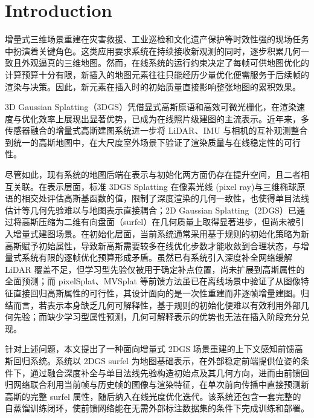 
\section{Introduction}

增量式三维场景重建在灾害救援、工业巡检和文化遗产保护等时效性强的现场任务中扮演着关键角色。这类应用要求系统在持续接收新观测的同时，逐步积累几何一致且外观逼真的三维地图。然而，在线系统的运行约束决定了每帧可供地图优化的计算预算十分有限，新插入的地图元素往往只能经历少量优化便需服务于后续帧的渲染与决策。因此，新元素在插入时的初始质量直接影响整张地图的累积效果。

3D Gaussian Splatting（3DGS）凭借显式高斯原语和高效可微光栅化，在渲染速度与优化效率上展现出显著优势，已成为在线照片级建图的主流表示。近年来，多传感器融合的增量式高斯建图系统进一步将 LiDAR、IMU 与相机的互补观测整合到统一的高斯地图中，在大尺度室外场景下验证了渲染质量与在线稳定性的可行性。

尽管如此，现有系统的地图后端在表示与初始化两方面仍存在提升空间，且二者相互关联。在表示层面，标准 3DGS Splatting 在​​像素光线 (pixel ray)​​ 与三维椭球原语的相交处评估高斯基函数的值，限制了深度渲染的几何一致性，也使得单目法线估计等几何先验难以与地图表示直接耦合；2D Gaussian Splatting（2DGS）已通过将高斯压缩为二维有向盘面（surfel）在几何质量上取得显著进步，但尚未被引入增量式建图场景。在初始化层面，当前系统通常采用基于规则的初始化策略为新高斯赋予初始属性，导致新高斯需要较多在线优化步数才能收敛到合理状态，与增量式系统有限的逐帧优化预算形成矛盾。虽然已有系统引入深度补全网络缓解 LiDAR 覆盖不足，但学习型先验仅被用于确定补点位置，尚未扩展到高斯属性的全面预测；而 pixelSplat、MVSplat 等前馈方法虽已在离线场景中验证了从图像特征直接回归高斯属性的可行性，其设计面向的是一次性重建而非逐帧增量建图。归结而言，若表示本身缺乏几何可解释性，基于规则的初始化便难以有效利用外部几何先验；而缺少学习型属性预测，几何可解释表示的优势也无法在插入阶段充分兑现。

针对上述问题，本文提出了一种面向增量式 2DGS 场景重建的上下文感知前馈高斯回归系统。系统以 2DGS surfel 为地图基础表示，在外部稳定前端提供位姿的条件下，通过融合深度补全与单目法线先验构造初始点及其几何方向，进而由前馈回归网络联合利用当前帧与历史帧的图像与渲染特征，在单次前向传播中直接预测新高斯的完整 surfel 属性，随后纳入在线光度优化迭代。该系统还包含一套完整的自蒸馏训练闭环，使前馈网络能在无需外部标注数据集的条件下完成训练和部署。

